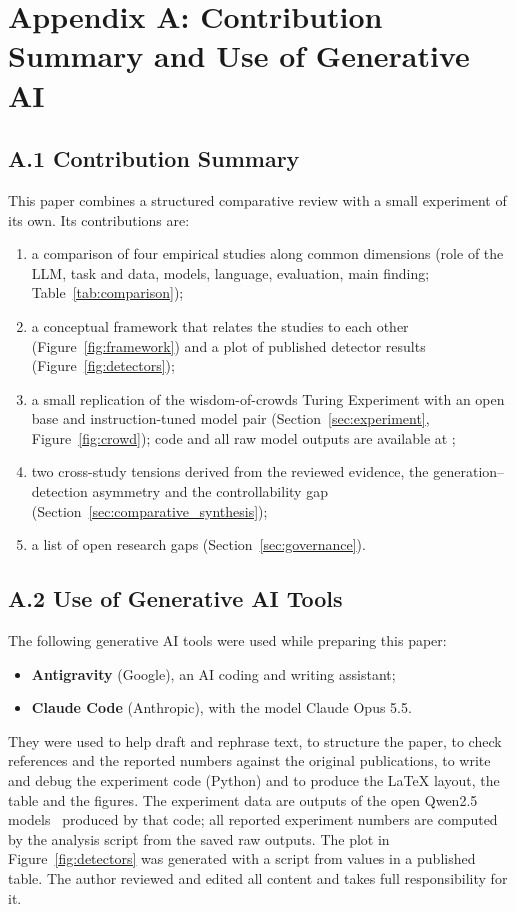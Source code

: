 \section*{Appendix A: Contribution Summary and Use of Generative AI}
\label{sec:ai_declaration}

\subsection*{A.1 Contribution Summary}
This paper combines a structured comparative review with a small experiment of its own. Its contributions are:
\begin{enumerate}
    \item a comparison of four empirical studies along common dimensions (role of the LLM, task and data, models, language, evaluation, main finding; Table~\ref{tab:comparison});
    \item a conceptual framework that relates the studies to each other (Figure~\ref{fig:framework}) and a plot of published detector results (Figure~\ref{fig:detectors});
    \item a small replication of the wisdom-of-crowds Turing Experiment with an open base and instruction-tuned model pair (Section~\ref{sec:experiment}, Figure~\ref{fig:crowd}); code and all raw model outputs are available at \repourl;
    \item two cross-study tensions derived from the reviewed evidence, the generation--detection asymmetry and the controllability gap (Section~\ref{sec:comparative_synthesis});
    \item a list of open research gaps (Section~\ref{sec:governance}).
\end{enumerate}

\subsection*{A.2 Use of Generative AI Tools}
The following generative AI tools were used while preparing this paper:
\begin{itemize}
    \item \textbf{Antigravity} (Google), an AI coding and writing assistant;
    \item \textbf{Claude Code} (Anthropic), with the model Claude Opus 5.5.
\end{itemize}
They were used to help draft and rephrase text, to structure the paper, to check references and the reported numbers against the original publications, to write and debug the experiment code (Python) and to produce the LaTeX layout, the table and the figures. The experiment data are outputs of the open Qwen2.5 models~\cite{qwen2024qwen25} produced by that code; all reported experiment numbers are computed by the analysis script from the saved raw outputs. The plot in Figure~\ref{fig:detectors} was generated with a script from values in a published table. The author reviewed and edited all content and takes full responsibility for it.
